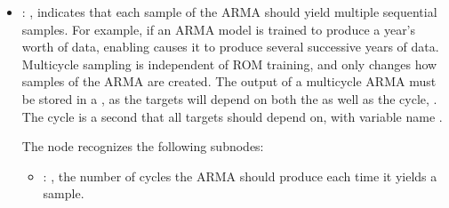 \begin{itemize}
      The  node recognizes the following subnodes:
      \begin{itemize}
        \item {}: ,
          lists the (fundamental)                                                    periodic
          wavelength of the Fourier decomposition for these variables,
          as in the  general node.
      \end{itemize}

    \item {}: ,
      indicates that each sample of the ARMA should yield
      multiple sequential samples. For example, if an ARMA model is trained to produce a year's
      worth of data,                                                    enabling
       causes it to produce several successive years of data. Multicycle
      sampling                                                    is independent of ROM training,
      and only changes how samples of the ARMA are created.
      \nb The output of a multicycle ARMA must be stored in a , as the targets will
      depend                                                    on both the 
      as well as the cycle, . The cycle is a second
       that all targets should depend on, with variable name .

      The  node recognizes the following subnodes:
      \begin{itemize}
        \item {}: ,
          the number of cycles the ARMA should produce
          each time it yields a sample.


\end{itemize}
\end{itemize}
